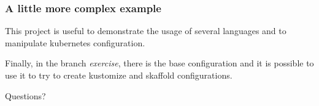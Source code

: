 	\begin{frame}
		\frametitle{A little more complex example}
		
		This project is useful to demonstrate the usage of several languages and to manipulate kubernetes configuration.
		
		\medskip
		
		Finally, in the branch \textit{exercise}, there is the base configuration and it is possible to use it to try to create kustomize and skaffold configurations.
	\end{frame}
	
	\begin{frame}
		\begin{center}
			Questions?
		\end{center}
	\end{frame}